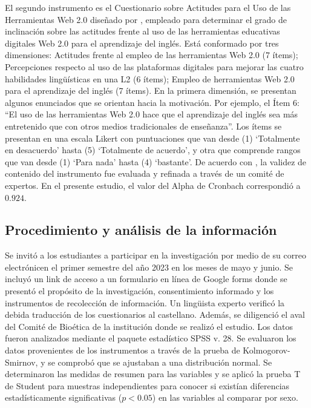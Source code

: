 \documentclass[spanish]{textolivre}
\begin{document}
El segundo instrumento es el Cuestionario sobre Actitudes para el Uso de las Herramientas Web 2.0 diseñado por \textcite{seleviciene_university_2015}, empleado para determinar el grado de inclinación sobre las actitudes frente al uso de las herramientas educativas digitales Web 2.0 para el aprendizaje del inglés. Está conformado por tres dimensiones: Actitudes frente al empleo de las herramientas Web 2.0 (7 ítems); Percepciones respecto al uso de las plataformas digitales para mejorar las cuatro habilidades lingüísticas en una L2 (6 ítems); Empleo de herramientas Web 2.0 para el aprendizaje del inglés (7 ítems). En la primera dimensión, se presentan algunos enunciados que se orientan hacia la motivación. Por ejemplo, el Ítem 6: “El uso de las herramientas Web 2.0 hace que el aprendizaje del inglés sea más entretenido que con otros medios tradicionales de enseñanza”. Los ítems se presentan en una escala Likert con puntuaciones que van desde (1) ‘Totalmente en desacuerdo’ hasta (5) ‘Totalmente de acuerdo’, y otra que comprende rangos que van desde (1) ‘Para nada’ hasta (4) ‘bastante’. De acuerdo con \textcite{seleviciene_university_2015}, la validez de contenido del instrumento fue evaluada y refinada a través de un comité de expertos. En el presente estudio, el valor del Alpha de Cronbach correspondió a $\num{0,924}$.


\subsection{Procedimiento y análisis de la información}\label{sec-fmt-manuscrito}
Se invitó a los estudiantes a participar en la investigación por medio de su correo electrónicen el primer semestre del año 2023 en los meses de mayo y junio. Se incluyó un link de acceso a un formulario en línea de Google forms donde se presentó el propósito de la investigación, consentimiento informado y los instrumentos de recolección de información. Un lingüista experto verificó la debida traducción de los cuestionarios al castellano. Además, se diligenció el aval del Comité de Bioética de la institución donde se realizó el estudio. Los datos fueron analizados mediante el paquete estadístico SPSS v. 28. Se evaluaron los datos provenientes de los instrumentos a través de la prueba de Kolmogorov-Smirnov, y se comprobó que se ajustaban a una distribución normal. Se determinaron las medidas de resumen para las variables y se aplicó la prueba T de Student para muestras independientes para conocer si existían diferencias estadísticamente significativas ($p < \num{0,05}$) en las variables al comparar por sexo.
\end{document}
